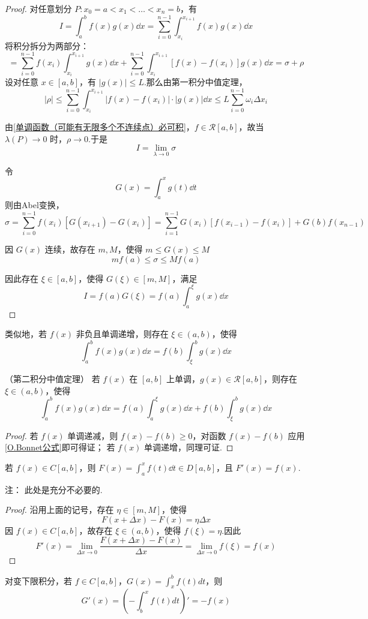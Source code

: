 \begin{proof}
	对任意划分 $P: x_0 = a < x_1 < \dots < x_n = b$，有
	\[
	I = \int_a^b f(x)g(x) \dd x = \sum_{i=0}^{n-1} \int_{x_i}^{x_{i+1}} f(x)g(x) \dd x
	\]
	将积分拆分为两部分：
	\[
	= \sum_{i=0}^{n-1} f(x_i) \int_{x_i}^{x_{i+1}} g(x) \dd x + \sum_{i=0}^{n-1} \int_{x_i}^{x_{i+1}} \left[f(x) - f(x_i)\right]g(x) \dd x = \sigma + \rho
	\]
	设对任意 \( x \in [a,b] \)，有 \( |g(x)| \leq L \).那么由第一积分中值定理，
	\[
	|\rho| \leq \sum_{i=0}^{n-1} \int_{x_i}^{x_{i+1}} |f(x) - f(x_i)| \cdot |g(x)| \dd x \leq L \sum_{i=0}^{n-1} \omega_i \Delta x_i
	\]
	
	由\ref{单调函数（可能有无限多个不连续点）必可积}，\( f \in \mathcal{R}[a,b] \)，故当 \( \lambda(P) \to 0 \) 时，\( \rho \to 0 \).于是
	\[
	I = \lim_{\lambda \to 0} \sigma
	\]
	
	令
	\[
	G(x) = \int_a^x g(t) \dd t
	\]
	则由Abel变换，
	\[
	\sigma = \sum_{i=0}^{n-1} f(x_i) \left[ G(x_{i+1}) - G(x_i) \right] = \sum_{i=1}^{n-1} G(x_i) \left[ f(x_{i-1}) - f(x_i) \right] + G(b) f(x_{n-1})
	\]
	
	因 \( G(x) \) 连续，故存在 \( m,M \)，使得 \( m \leq G(x) \leq M \) 
	\[
	m f(a) \leq \sigma \leq M f(a)
	\]
	
	因此存在 \( \xi \in [a,b] \)，使得 \( G(\xi) \in [m,M] \)，满足
	\[
	I = f(a) G(\xi) = f(a) \int_a^\xi g(x) \dd x
	\]
	
\end{proof}

类似地，若 \( f(x) \) 非负且单调递增，则存在 \( \xi \in (a,b) \)，使得
\[
\int_a^b f(x)g(x) \dd x = f(b) \int_\xi^b g(x) \dd x
\]
\begin{proposition}（第二积分中值定理）
	若 \( f(x) \) 在 \( [a,b] \) 上单调，\( g(x) \in \mathcal{R}[a,b] \)，则存在 \( \xi \in (a,b) \)，使得
	\[
	\int_a^b f(x)g(x) \dd x = f(a)\int_a^\xi g(x) \dd x + f(b)\int_\xi^b g(x) \dd x
	\]
	
	
\end{proposition}
\begin{proof}
	若 \( f(x) \) 单调递减，则 \( f(x) - f(b) \geq 0 \)，对函数 \( f(x) - f(b) \) 应用\ref{O.Bonnet公式}即可得证；
	若 \( f(x) \) 单调递增，同理可证.
\end{proof}

\begin{proposition}\label{F'(x) = f(x)}
	若 \( f(x) \in C[a,b] \)，则 \( F(x) = \displaystyle\int_a^x f(t)\dd t \in D[a,b] \)，且 \( F'(x) = f(x) \).
	
\end{proposition}
注： 此处是充分不必要的.
\begin{proof}
	沿用上面的记号，存在 \( \eta \in [m,M] \)，使得
	\[
	F(x+\Delta x) - F(x) = \eta \Delta x
	\]
	因 \( f(x) \in C[a,b] \)，故存在 \( \xi \in (a,b) \)，使得 \( f(\xi) = \eta \).因此
	\[
	F'(x) = \lim_{\Delta x \to 0} \frac{F(x+\Delta x) - F(x)}{\Delta x} = \lim_{\Delta x \to 0} f(\xi) = f(x)
	\]
	
\end{proof}
对变下限积分，若 \( f \in C[a,b] \)，\( G(x) = \displaystyle\int_x^b f(t)dt \)，则
\[
G'(x) = \left( -\int_b^x f(t)dt \right)' = -f(x)
\]


